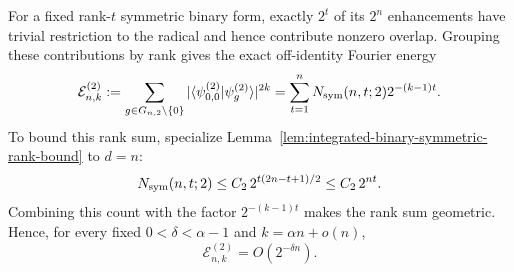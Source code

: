 \documentclass[11pt]{article}
\newcommand{\1}{\mathbf 1}
\theoremstyle{plain}
\theoremstyle{definition}
\theoremstyle{remark}
\begin{document}
For a fixed rank-$t$ symmetric binary form, exactly $2^t$ of its $2^n$
enhancements have trivial restriction to the radical and hence contribute
nonzero overlap.  Grouping these contributions by rank gives the exact
off-identity Fourier energy
\begin{equation}
 \mathcal E_{n,k}^{(2)}
 :=\sum_{g\in G_{n,2}\setminus\{0\}}
 |\langle\psi_{0,0}^{(2)}|\psi_g^{(2)}\rangle|^{2k}
 =\sum_{t=1}^nN_{\rm sym}(n,t;2)2^{-(k-1)t}.
 \label{eq:integrated-qubit-exact-fourier-energy}
\end{equation}
To bound this rank sum, specialize
Lemma~\ref{lem:integrated-binary-symmetric-rank-bound} to $d=n$:
\begin{equation}
 N_{\rm sym}(n,t;2)\le C_2\,2^{t(2n-t+1)/2}\le C_2\,2^{nt}.
 \label{eq:integrated-qubit-rank-bound}
\end{equation}
Combining this count with the factor $2^{-(k-1)t}$ makes the rank sum
geometric.  Hence, for every fixed $0<\delta<\alpha-1$ and
$k=\alpha n+o(n)$,
\begin{equation}
 \mathcal E_{n,k}^{(2)}=O(2^{-\delta n}).
 \label{eq:integrated-qubit-energy-decay}
\end{equation}
\end{document}
